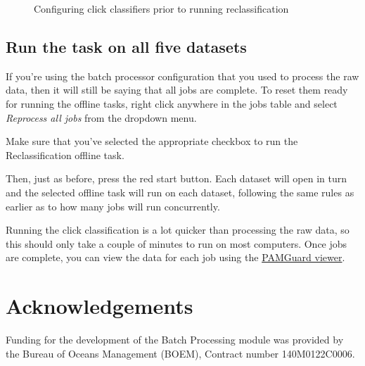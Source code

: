 \documentclass[
]{article}
\begin{document}
\begin{figure}
\begin{minipage}{0.55\linewidth}
{}


\end{minipage}%

\caption{\label{fig-reclass}Configuring click classifiers prior to
running reclassification}

\end{figure}%

\subsection{Run the task on all five
datasets}\label{run-the-task-on-all-five-datasets}

If you're using the batch processor configuration that you used to
process the raw data, then it will still be saying that all jobs are
complete. To reset them ready for running the offline tasks, right click
anywhere in the jobs table and select \emph{Reprocess all jobs} from the
dropdown menu.

Make sure that you've selected the appropriate checkbox to run the
Reclassification offline task.

Then, just as before, press the red start button. Each dataset will open
in turn and the selected offline task will run on each dataset,
following the same rules as earlier as to how many jobs will run
concurrently.

Running the click classification is a lot quicker than processing the
raw data, so this should only take a couple of minutes to run on most
computers. Once jobs are complete, you can view the data for each job
using the
\href{https://www.pamguard.org/olhelp/overview/PamMasterHelp/docs/viewerMode.html}{PAMGuard
viewer}.

\section{Acknowledgements}\label{acknowledgements}

Funding for the development of the Batch Processing module was provided
by the Bureau of Oceans Management (BOEM), Contract number
140M0122C0006.
\end{document}
